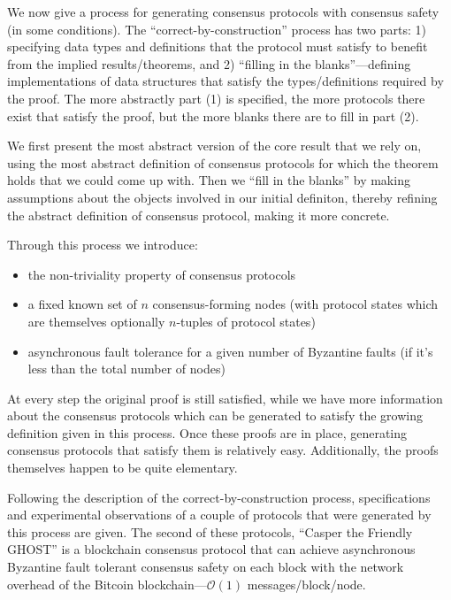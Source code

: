 \documentclass{article}
\theoremstyle{definition}
\begin{document}
We now give a process for generating consensus protocols with consensus safety (in some conditions). The ``correct-by-construction'' process has two parts: 1) specifying data types and definitions that the protocol must satisfy to benefit from the implied results/theorems, and 2) ``filling in the blanks''---defining implementations of data structures that satisfy the types/definitions required by the proof. The more abstractly part (1) is specified, the more protocols there exist that satisfy the proof, but the more blanks there are to fill in part (2).

We first present the most abstract version of the core result that we rely on, using the most abstract definition of consensus protocols for which the theorem holds that we could come up with. Then we ``fill in the blanks'' by making assumptions about the objects involved in our initial definiton, thereby refining the abstract definition of consensus protocol, making it more concrete.

Through this process we introduce:

\begin{itemize}
\item the non-triviality property of consensus protocols 
\item a fixed known set of $n$ consensus-forming nodes (with protocol states which are themselves optionally $n$-tuples of protocol states)
\item asynchronous fault tolerance for a given number of Byzantine faults (if it's less than the total number of nodes)
\end{itemize}

At every step the original proof is still satisfied, while we have more information about the consensus protocols which can be generated to satisfy the growing definition given in this process. Once these proofs are in place, generating consensus protocols that satisfy them is relatively easy. Additionally, the proofs themselves happen to be quite elementary.

Following the description of the correct-by-construction process, specifications and experimental observations of a couple of protocols that were generated by this process are given. The second of these protocols, ``Casper the Friendly GHOST'' is a blockchain consensus protocol that can achieve asynchronous Byzantine fault tolerant consensus safety on each block with the network overhead of the Bitcoin blockchain---$\mathcal{O}(1)$ messages/block/node.
\end{document}
